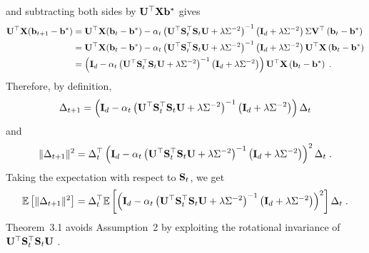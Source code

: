 and subtracting both sides by $\mathbf{U}^\top\mathbf{X}\mathbf{b}^*$ gives
\begin{align*}
\mathbf{U}^\top\mathbf{X}(\mathbf{b}_{t+1}-\mathbf{b}^*) &= \mathbf{U}^\top\mathbf{X}(\mathbf{b}_t-\mathbf{b}^*) - \alpha_t\left(\mathbf{U}^\top\mathbf{S}_t^\top\mathbf{S}_t\mathbf{U} + \lambda\Sigma^{-2}\right)^{-1}\left(\mathbf{I}_d + \lambda\Sigma^{-2} \right)\Sigma\mathbf{V}^\top\left(\mathbf{b}_t-\mathbf{b}^*\right) \\
&= \mathbf{U}^\top\mathbf{X}(\mathbf{b}_t-\mathbf{b}^*) - \alpha_t\left(\mathbf{U}^\top\mathbf{S}_t^\top\mathbf{S}_t\mathbf{U} + \lambda\Sigma^{-2}\right)^{-1}\left(\mathbf{I}_d + \lambda\Sigma^{-2} \right)\mathbf{U}^\top\mathbf{X}\left(\mathbf{b}_t-\mathbf{b}^*\right) \\
&= \left(\mathbf{I}_d - \alpha_t\left(\mathbf{U}^\top\mathbf{S}_t^\top\mathbf{S}_t\mathbf{U} + \lambda\Sigma^{-2}\right)^{-1}\left(\mathbf{I}_d + \lambda\Sigma^{-2}\right)\right)\mathbf{U}^\top\mathbf{X}\left(\mathbf{b}_t-\mathbf{b}^*\right) \;.
\end{align*}
Therefore, by definition,
\[
\Delta_{t+1} = \left(\mathbf{I}_d - \alpha_t\left(\mathbf{U}^\top\mathbf{S}_t^\top\mathbf{S}_t\mathbf{U} + \lambda\Sigma^{-2}\right)^{-1}\left(\mathbf{I}_d + \lambda\Sigma^{-2}\right)\right)\Delta_t
\]
and
\[
\|\Delta_{t+1}\|^2 = \Delta_t^\top\left(\mathbf{I}_d - \alpha_t\left(\mathbf{U}^\top\mathbf{S}_t^\top\mathbf{S}_t\mathbf{U} + \lambda\Sigma^{-2}\right)^{-1}\left(\mathbf{I}_d + \lambda\Sigma^{-2}\right)\right)^2\Delta_t \;.
\]
Taking the expectation with respect to $\mathbf{S}_t$, we get
\[
\mathbb{E}\left[\|\Delta_{t+1}\|^2\right] = \Delta_t^\top\mathbb{E}\left[\left(\mathbf{I}_d - \alpha_t\left(\mathbf{U}^\top\mathbf{S}_t^\top\mathbf{S}_t\mathbf{U} + \lambda\Sigma^{-2}\right)^{-1}\left(\mathbf{I}_d + \lambda\Sigma^{-2}\right)\right)^2\right]\Delta_t \;.
\]
\todo Theorem~3.1 avoids Assumption~2 by exploiting the rotational invariance of $\mathbf{U}^\top\mathbf{S}_t^\top\mathbf{S}_t\mathbf{U}$ \todo.


